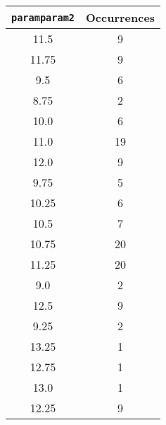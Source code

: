 \documentclass[letterpaper, 12pt]{article}
\begin{document}
\begin{longtable}{|c|c|}
\hline
\textbf{\texttt{paramparam2}} & \textbf{Occurrences} \\
\hline
11.5 & 9 \\
\hline
11.75 & 9 \\
\hline
9.5 & 6 \\
\hline
8.75 & 2 \\
\hline
10.0 & 6 \\
\hline
11.0 & 19 \\
\hline
12.0 & 9 \\
\hline
9.75 & 5 \\
\hline
10.25 & 6 \\
\hline
10.5 & 7 \\
\hline
10.75 & 20 \\
\hline
11.25 & 20 \\
\hline
9.0 & 2 \\
\hline
12.5 & 9 \\
\hline
9.25 & 2 \\
\hline
13.25 & 1 \\
\hline
12.75 & 1 \\
\hline
13.0 & 1 \\
\hline
12.25 & 9 \\
\hline
\end{longtable}
\end{document}
